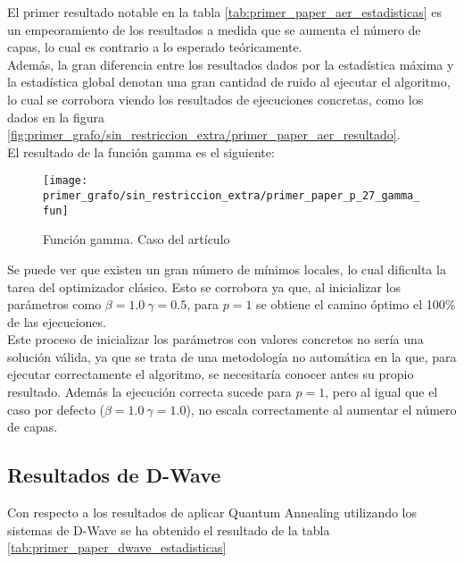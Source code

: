 \documentclass{article}
\begin{document}
El primer resultado notable en la tabla \ref{tab:primer_paper_aer_estadisticas} es un empeoramiento de los resultados a medida que se aumenta el número de capas, lo cual es contrario a lo esperado teóricamente. \\
Además, la gran diferencia entre los resultados dados por la estadística máxima y la estadística global denotan una gran cantidad de ruido al ejecutar el algoritmo, lo cual se corrobora viendo los resultados de ejecuciones concretas, como los dados en la figura \ref{fig:primer_grafo/sin_restriccion_extra/primer_paper_aer_resultado}. \\

El resultado de la función gamma es el siguiente:
\begin{figure}[htbp]
  \centering
  \texttt{[image: primer\_grafo/sin\_restriccion\_extra/primer\_paper\_p\_27\_gamma\_fun]}
  \caption{Función gamma. Caso del artículo}
  \label{fig:primer_grafo/sin_restriccion_extra/primer_paper_p_27_gamma_fun}
\end{figure}

Se puede ver que existen un gran número de mínimos locales, lo cual dificulta la tarea del optimizador clásico. Esto se corrobora ya que, al inicializar los parámetros como \(\beta = 1.0 \ \gamma = 0.5\), para \(p = 1\) se obtiene el camino óptimo el 100\% de las ejecuciones. \\
Este proceso de inicializar los parámetros con valores concretos no sería una solución válida, ya que se trata de una metodología no automática en la que, para ejecutar correctamente el algoritmo, se necesitaría conocer antes su propio resultado. Además la ejecución correcta sucede para \(p = 1\), pero al igual que el caso por defecto (\(\beta = 1.0 \ \gamma = 1.0\)), no escala correctamente al aumentar el número de capas.


\subsection{Resultados de D-Wave}
\label{sec:resultados-de-qiskit}
Con respecto a los resultados de aplicar Quantum Annealing utilizando los sistemas de D-Wave se ha obtenido el resultado de la tabla \ref{tab:primer_paper_dwave_estadisticas}
\end{document}
